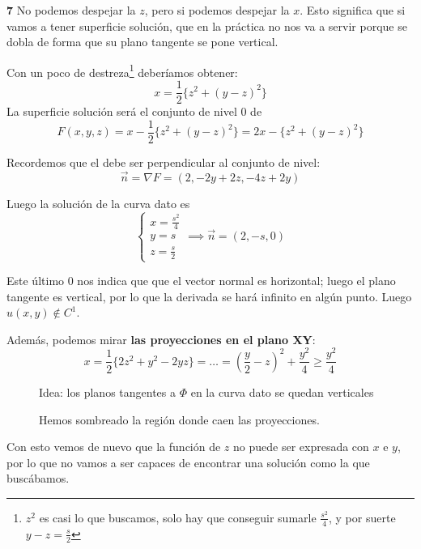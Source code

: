 \begin{example}{\bf 7}
		No podemos despejar la $z$, pero si podemos despejar la $x$. Esto significa que si vamos a tener superficie solución, que en la práctica no nos va a servir porque se dobla de forma que su plano tangente se pone vertical.

		Con un poco de destreza\footnote{$z^2$ es casi lo que buscamos, solo hay que conseguir sumarle $\frac{s^2}{4}$, y por suerte $y-z = \frac{s}{2}$} deberíamos obtener:
		\[
		x = \frac{1}{2} \{z^2 + (y-z)^2\}
		\]
		La superficie solución será el conjunto de nivel 0 de \[F(x,y,z)= x - \frac{1}{2} \{z^2 + (y-z)^2\} = 2x-\{z^2 + (y-z)^2\}\]

		Recordemos que el  debe ser perpendicular al conjunto de nivel:
		\[\vec{n} = \nabla F = (2,-2y+2z, -4z+2y)\]

		Luego la solución de la curva dato es
		\[
		\begin{cases}
			x=\frac{s^2}{4} \\
			y = s \\
			z = \frac{s}{2}
		\end{cases}
		\implies \vec{n} = (2,-s,0)
		\]

		Este último 0 nos indica que que el vector normal es horizontal; luego el plano tangente es vertical, por lo que la derivada se hará infinito en algún punto. Luego $u(x,y) \notin C^1$.

		Además, podemos mirar {\bf las proyecciones en el plano XY}:
		\[x = \frac{1}{2} \{2z^2 + y^2 - 2yz\} = … = (\frac{y}{2} - z)^2 + \frac{y^2}{4} \geq \frac{y^2}{4}\]

		\begin{figure}[hbtp]
			\begin{minipage}[t]{0.45\textwidth}
				\caption{Idea: los planos tangentes a $\Phi$ en la curva dato se quedan verticales }
			\end{minipage}
			\quad %
			\begin{minipage}[t]{0.45\textwidth}
				\caption{Hemos sombreado la región donde caen las proyecciones.}
				\label{fig:Ejemplo7-ProyXY}
			\end{minipage}
		\end{figure}

		Con esto vemos de nuevo que la función de $z$ no puede ser expresada con $x$ e $y$, por lo que no vamos a ser capaces de encontrar una solución como la que buscábamos.


	\end{example}
